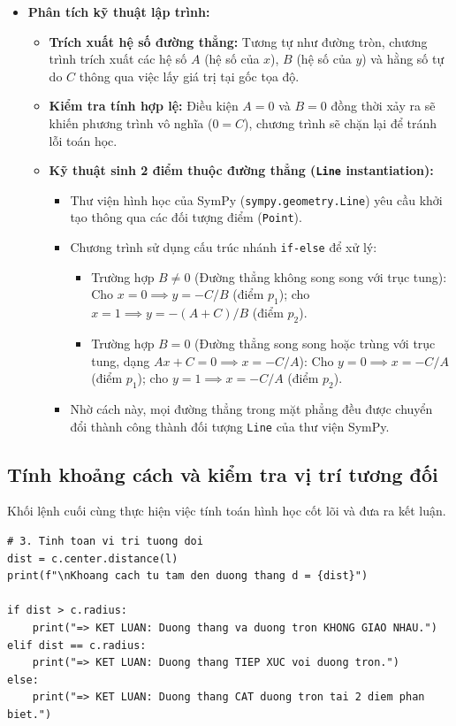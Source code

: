 \documentclass[12pt,a4paper]{article}
\begin{document}
\begin{itemize}
    \item \textbf{Phân tích kỹ thuật lập trình:}
    \begin{itemize}
        \item \textbf{Trích xuất hệ số đường thẳng:} Tương tự như đường tròn, chương trình trích xuất các hệ số $A$ (hệ số của $x$), $B$ (hệ số của $y$) và hằng số tự do $C$ thông qua việc lấy giá trị tại gốc tọa độ.
        \item \textbf{Kiểm tra tính hợp lệ:} Điều kiện $A = 0$ và $B = 0$ đồng thời xảy ra sẽ khiến phương trình vô nghĩa ($0 = C$), chương trình sẽ chặn lại để tránh lỗi toán học.
        \item \textbf{Kỹ thuật sinh 2 điểm thuộc đường thẳng (\texttt{Line} instantiation):}
        \begin{itemize}
            \item Thư viện hình học của SymPy (\texttt{sympy.geometry.Line}) yêu cầu khởi tạo thông qua các đối tượng điểm (\texttt{Point}).
            \item Chương trình sử dụng cấu trúc nhánh \texttt{if-else} để xử lý:
            \begin{itemize}
                \item Trường hợp $B \neq 0$ (Đường thẳng không song song với trục tung): Cho $x = 0 \implies y = -C/B$ (điểm $p_1$); cho $x = 1 \implies y = -(A + C)/B$ (điểm $p_2$).
                \item Trường hợp $B = 0$ (Đường thẳng song song hoặc trùng với trục tung, dạng $Ax + C = 0 \implies x = -C/A$): Cho $y = 0 \implies x = -C/A$ (điểm $p_1$); cho $y = 1 \implies x = -C/A$ (điểm $p_2$).
            \end{itemize}
            \item Nhờ cách này, mọi đường thẳng trong mặt phẳng đều được chuyển đổi thành công thành đối tượng \texttt{Line} của thư viện  SymPy.
        \end{itemize}
    \end{itemize}
\end{itemize}

\subsection{Tính khoảng cách và kiểm tra vị trí tương đối}

Khối lệnh cuối cùng thực hiện việc tính toán hình học cốt lõi và đưa ra kết luận.
\begin{lstlisting}
# 3. Tinh toan vi tri tuong doi
dist = c.center.distance(l)
print(f"\nKhoang cach tu tam den duong thang d = {dist}")

if dist > c.radius:
    print("=> KET LUAN: Duong thang va duong tron KHONG GIAO NHAU.")
elif dist == c.radius:
    print("=> KET LUAN: Duong thang TIEP XUC voi duong tron.")
else:
    print("=> KET LUAN: Duong thang CAT duong tron tai 2 diem phan biet.")
\end{lstlisting}
\end{document}
